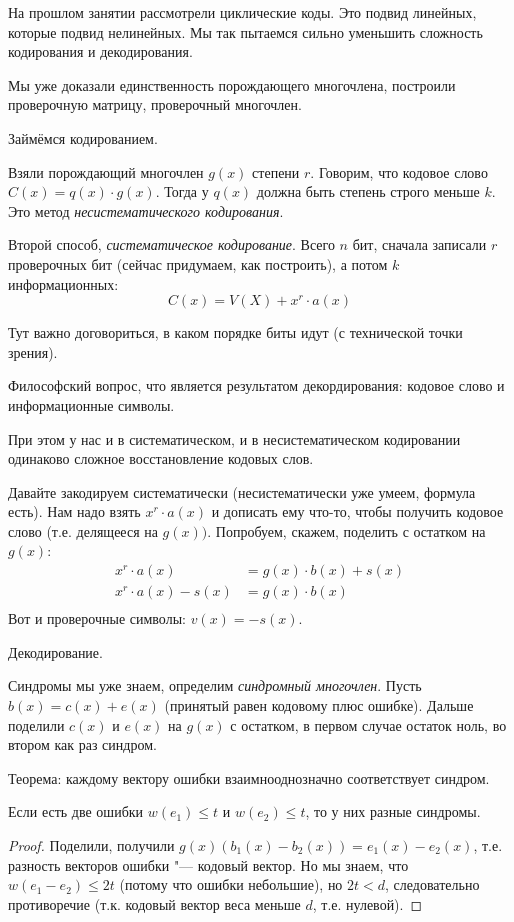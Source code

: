 На прошлом занятии рассмотрели циклические коды.
Это подвид линейных, которые подвид нелинейных.
Мы так пытаемся сильно уменьшить сложность кодирования и декодирования.

Мы уже доказали единственность порождающего многочлена, построили
проверочную матрицу, проверочный многочлен.

Займёмся кодированием.

Взяли порождающий многочлен $g(x)$ степени $r$.
Говорим, что кодовое слово $C(x)=q(x) \cdot g(x)$.
Тогда у $q(x)$ должна быть степень строго меньше $k$.
Это метод \textit{несистематического кодирования}.

Второй способ, \textit{систематическое кодирование}.
Всего $n$ бит, сначала записали $r$ проверочных бит (сейчас придумаем, как построить),
а потом $k$ информационных:
\[
C(x) = V(X) + x^r \cdot a(x)
\]
\begin{Rem}
Тут важно договориться, в каком порядке биты идут (с технической точки зрения).
\end{Rem}
\begin{Rem}
Философский вопрос, что является результатом декордирования:
кодовое слово и информационные символы.
\end{Rem}
При этом у нас и в систематическом, и в несистематическом кодировании
одинаково сложное восстановление кодовых слов.

Давайте закодируем систематически (несистематически уже умеем, формула есть).
Нам надо взять $x^r \cdot a(x)$ и дописать ему что-то, чтобы получить кодовое слово
(т.е. делящееся на $g(x))$.
Попробуем, скажем, поделить с остатком на $g(x)$:
\begin{gather*}
	x^r \cdot a(x) &= g(x) \cdot b(x) + s(x) \\
	x^r \cdot a(x) - s(x) &= g(x) \cdot b(x) \\
\end{gather*}
Вот и проверочные символы: $v(x)=-s(x)$.

Декодирование.

Синдромы мы уже знаем, определим \textit{синдромный многочлен}.
Пусть $b(x)=c(x)+e(x)$ (принятый равен кодовому плюс ошибке).
Дальше поделили $c(x)$ и $e(x)$ на $g(x)$ с остатком, в первом случае остаток ноль,
во втором как раз синдром.

Теорема: каждому вектору ошибки взаимнооднозначно соответствует синдром.
\begin{theorem}
	Если есть две ошибки $w(e_1)\le t$ и $w(e_2) \le t$,
	то у них разные синдромы.
\end{theorem}
\begin{proof}
	Поделили, получили $g(x)(b_1(x)-b_2(x))=e_1(x)-e_2(x)$, т.е.
	разность векторов ошибки "--- кодовый вектор.
	Но мы знаем, что $w(e_1-e_2)\le 2t$ (потому что ошибки небольшие),
	но $2t < d$, следовательно противоречие (т.к. кодовый вектор веса
	меньше $d$, т.е. нулевой).
\end{proof}


